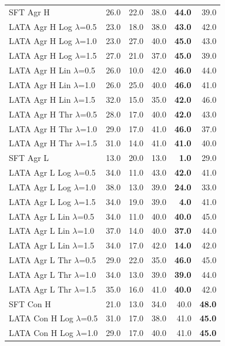 \begin{longtable}{lrrrrr}
SFT Agr H & 26.0 & 22.0 & 38.0 & \textbf{44.0} & 39.0 \\
LATA Agr H Log $\lambda$=0.5 & 23.0 & 18.0 & 38.0 & \textbf{43.0} & 42.0 \\
LATA Agr H Log $\lambda$=1.0 & 23.0 & 27.0 & 40.0 & \textbf{45.0} & 43.0 \\
LATA Agr H Log $\lambda$=1.5 & 27.0 & 21.0 & 37.0 & \textbf{45.0} & 39.0 \\
LATA Agr H Lin $\lambda$=0.5 & 26.0 & 10.0 & 42.0 & \textbf{46.0} & 44.0 \\
LATA Agr H Lin $\lambda$=1.0 & 26.0 & 25.0 & 40.0 & \textbf{46.0} & 41.0 \\
LATA Agr H Lin $\lambda$=1.5 & 32.0 & 15.0 & 35.0 & \textbf{42.0} & 46.0 \\
LATA Agr H Thr $\lambda$=0.5 & 28.0 & 17.0 & 40.0 & \textbf{42.0} & 43.0 \\
LATA Agr H Thr $\lambda$=1.0 & 29.0 & 17.0 & 41.0 & \textbf{46.0} & 37.0 \\
LATA Agr H Thr $\lambda$=1.5 & 31.0 & 14.0 & 41.0 & \textbf{41.0} & 40.0 \\
SFT Agr L & 13.0 & 20.0 & 13.0 & \textbf{1.0} & 29.0 \\
LATA Agr L Log $\lambda$=0.5 & 34.0 & 11.0 & 43.0 & \textbf{42.0} & 41.0 \\
LATA Agr L Log $\lambda$=1.0 & 38.0 & 13.0 & 39.0 & \textbf{24.0} & 33.0 \\
LATA Agr L Log $\lambda$=1.5 & 34.0 & 19.0 & 39.0 & \textbf{4.0} & 41.0 \\
LATA Agr L Lin $\lambda$=0.5 & 34.0 & 11.0 & 40.0 & \textbf{40.0} & 45.0 \\
LATA Agr L Lin $\lambda$=1.0 & 37.0 & 14.0 & 40.0 & \textbf{37.0} & 44.0 \\
LATA Agr L Lin $\lambda$=1.5 & 34.0 & 17.0 & 42.0 & \textbf{14.0} & 42.0 \\
LATA Agr L Thr $\lambda$=0.5 & 29.0 & 22.0 & 35.0 & \textbf{46.0} & 45.0 \\
LATA Agr L Thr $\lambda$=1.0 & 34.0 & 13.0 & 39.0 & \textbf{39.0} & 44.0 \\
LATA Agr L Thr $\lambda$=1.5 & 35.0 & 16.0 & 41.0 & \textbf{40.0} & 42.0 \\
SFT Con H & 21.0 & 13.0 & 34.0 & 40.0 & \textbf{48.0} \\
LATA Con H Log $\lambda$=0.5 & 31.0 & 17.0 & 38.0 & 41.0 & \textbf{45.0} \\
LATA Con H Log $\lambda$=1.0 & 29.0 & 17.0 & 40.0 & 41.0 & \textbf{45.0} \\

\end{longtable}
